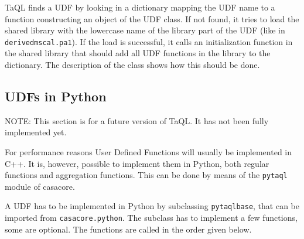TaQL finds a UDF by looking in a dictionary mapping the UDF name
to a function constructing an object of the UDF class. If not found,
it tries to load the shared library with the lowercase name of the library part
of the UDF (like in \texttt{derivedmscal.pa1}). If the load is successful, it calls an
initialization function in the shared library that should add all UDF
functions in the library to the dictionary. The description of the
class shows how this should be done.

\subsection{\label{TAQL:UDFPYTHON}UDFs in Python}
NOTE: This section is for a future version of TaQL. It has not been
fully implemented yet.

For performance reasons User Defined Functions will usually be
implemented in C++. It is, however, possible to implement them in
Python, both regular functions and aggregation functions. This can be
done by means of the \texttt{pytaql} module of casacore.

A UDF has to be implemented in Python by subclassing
\texttt{pytaqlbase}, that can be imported from \texttt{casacore.python}. 
The subclass has to implement a few functions, some are optional.
The functions are called in the order given below.


